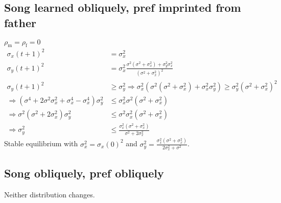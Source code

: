 \documentclass{article}
\newcommand{\x}[1]{\text{#1}}
\begin{document}
\subsection{Song learned obliquely, pref imprinted from father }
$\rho_\x{m}=\rho_\x{f}=0$
\begin{align*}
\sigma_x(t+1)^2&=\sigma_x^2
\\ \sigma_y(t+1)^2&= \sigma_x^2\frac{\sigma^2(\sigma^2+\sigma_x^2)+\sigma_y^2\sigma_x^2}{(\sigma^2+\sigma_x^2)^2}
\\ \sigma_y(t+1)^2&\geq\sigma_y^2 \Rightarrow \sigma_x^2(\sigma^2(\sigma^2+\sigma_x^2)+\sigma_x^2\sigma_y^2)\geq\sigma_y^2(\sigma^2+\sigma_x^2)^2
\\ \Rightarrow \left(\sigma^4+2\sigma^2\sigma_x^2+\sigma_x^4-\sigma_x^4\right)\sigma_y^2&\leq\sigma_x^2\sigma^2(\sigma^2+\sigma_x^2)
\\ \Rightarrow \sigma^2(\sigma^2+2\sigma_x^2)\sigma_y^2&\leq\sigma^2\sigma_x^2(\sigma^2+\sigma_x^2)
\\ \Rightarrow \sigma_y^2&\leq\frac{\sigma_x^2(\sigma^2+\sigma_x^2)}{\sigma^2+2\sigma_x^2} 
\end{align*}
Stable equilibrium with $\sigma_x^2=\sigma_x(0)^2$ and $\sigma_y^2=\frac{\sigma_x^2(\sigma^2+\sigma_x^2)}{2\sigma_x^2+\sigma^2}$.
\subsection{Song obliquely, pref obliquely }
Neither distribution changes.
\end{document}
